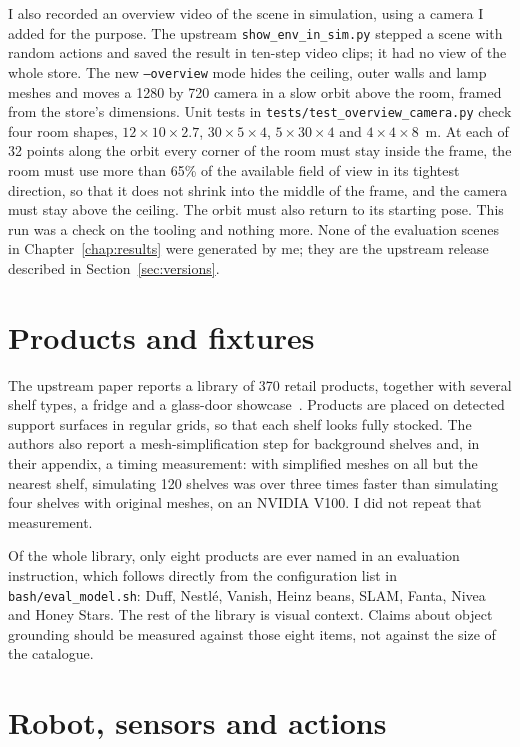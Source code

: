I also recorded an overview video of the scene in simulation, using a camera I added for the purpose. The upstream \texttt{show\_env\_in\_sim.py} stepped a scene with random actions and saved the result in ten-step video clips; it had no view of the whole store. The new \texttt{--overview} mode hides the ceiling, outer walls and lamp meshes and moves a 1280 by 720 camera in a slow orbit above the room, framed from the store's dimensions. Unit tests in \texttt{tests/test\_overview\_camera.py} check four room shapes, $12\times10\times2.7$, $30\times5\times4$, $5\times30\times4$ and $4\times4\times8$~m. At each of 32 points along the orbit every corner of the room must stay inside the frame, the room must use more than 65\% of the available field of view in its tightest direction, so that it does not shrink into the middle of the frame, and the camera must stay above the ceiling. The orbit must also return to its starting pose. This run was a check on the tooling and nothing more. None of the evaluation scenes in Chapter~\ref{chap:results} were generated by me; they are the upstream release described in Section~\ref{sec:versions}.

\section{Products and fixtures}

The upstream paper reports a library of 370 retail products, together with several shelf types, a fridge and a glass-door showcase~\cite{soshin2025robobenchmart}. Products are placed on detected support surfaces in regular grids, so that each shelf looks fully stocked. The authors also report a mesh-simplification step for background shelves and, in their appendix, a timing measurement: with simplified meshes on all but the nearest shelf, simulating 120 shelves was over three times faster than simulating four shelves with original meshes, on an NVIDIA V100. I did not repeat that measurement.

Of the whole library, only eight products are ever named in an evaluation instruction, which follows directly from the configuration list in \texttt{bash/eval\_model.sh}: Duff, Nestl\'e, Vanish, Heinz beans, SLAM, Fanta, Nivea and Honey Stars. The rest of the library is visual context. Claims about object grounding should be measured against those eight items, not against the size of the catalogue.

\section{Robot, sensors and actions}
\label{sec:robot}

